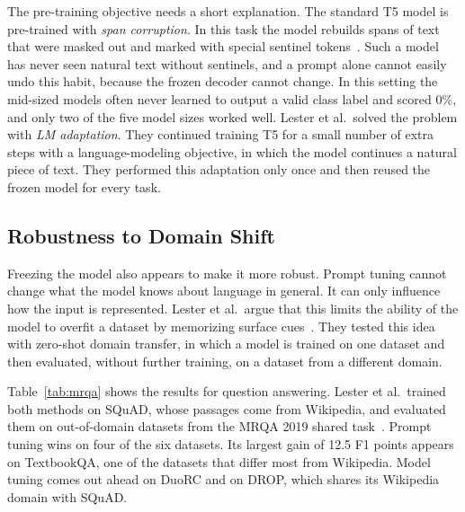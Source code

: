 \documentclass[12pt]{article}
\begin{document}
The pre-training objective needs a short explanation. The standard T5 model is pre-trained
with \emph{span corruption}. In this task the model rebuilds spans of text that were masked
out and marked with special sentinel tokens~\cite{lester2021}. Such a model has never seen
natural text without sentinels, and a prompt alone cannot easily undo this habit, because the
frozen decoder cannot change. In this setting the mid-sized models often never learned to
output a valid class label and scored 0\%, and only two of the five model sizes worked well.
Lester et al.\ solved the problem with \emph{LM adaptation}. They continued training T5 for a
small number of extra steps with a language-modeling objective, in which the model continues
a natural piece of text. They performed this adaptation only once and then reused the frozen
model for every task.

\subsection{Robustness to Domain Shift}\label{sec:domain}

Freezing the model also appears to make it more robust. Prompt tuning cannot change what the
model knows about language in general. It can only influence how the input is represented.
Lester et al.\ argue that this limits the ability of the model to overfit a dataset by
memorizing surface cues~\cite{lester2021}. They tested this idea with zero-shot domain
transfer, in which a model is trained on one dataset and then evaluated, without further
training, on a dataset from a different domain.

Table~\ref{tab:mrqa} shows the results for question answering. Lester et al.\ trained both
methods on SQuAD, whose passages come from Wikipedia, and evaluated them on out-of-domain
datasets from the MRQA 2019 shared task~\cite{lester2021}. Prompt tuning wins on four of the six datasets. Its
largest gain of 12.5 F1 points appears on TextbookQA, one of the datasets that differ most
from Wikipedia. Model tuning comes out ahead on DuoRC and on DROP, which shares its Wikipedia
domain with SQuAD.
\end{document}
